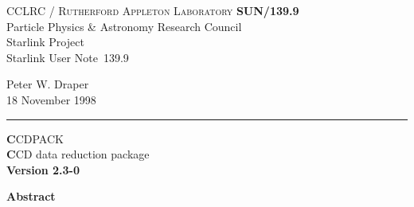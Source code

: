 \documentclass[twoside,11pt]{article}
\newcommand{\stardoccategory}  {Starlink User Note}
\newcommand{\stardocinitials}  {SUN}
\newcommand{\stardocnumber}    {139.9}
\newcommand{\stardocauthors}   {Peter W. Draper}
\newcommand{\stardocdate}      {18 November 1998}
\newcommand{\stardoctitle}     {CCDPACK}
\newcommand{\stardoconeline}   {CCD data reduction package}
\newcommand{\stardocversion}   {Version 2.3-0}
\newcommand{\stardocname}{\stardocinitials /\stardocnumber}
\newenvironment{latexonly}{}{}
\renewcommand{\_}{\texttt{\symbol{95}}}
\begin{document}
\thispagestyle{empty}

\begin{latexonly}
   CCLRC / \textsc{Rutherford Appleton Laboratory} \hfill \textbf{\stardocname}\\
   {\large Particle Physics \& Astronomy Research Council}\\
   {\large Starlink Project\\}
   {\large \stardoccategory\ \stardocnumber}
   \begin{flushright}
   \stardocauthors\\
   \stardocdate
   \end{flushright}
   \vspace{-4mm}
   \rule{\textwidth}{0.5mm}
   \vspace{5mm}
   \begin{center}
   {\Huge\textbf  \stardoctitle \\ [2.5ex]}
   {\LARGE\textbf \stardoconeline \\ [4ex]}
   {\large \bf \stardocversion}
   \end{center}
   \vspace{5mm}


   \vspace{10mm}
   \begin{center}
      {\Large\textbf{Abstract}}
   \end{center}
\end{latexonly}
\end{document}

